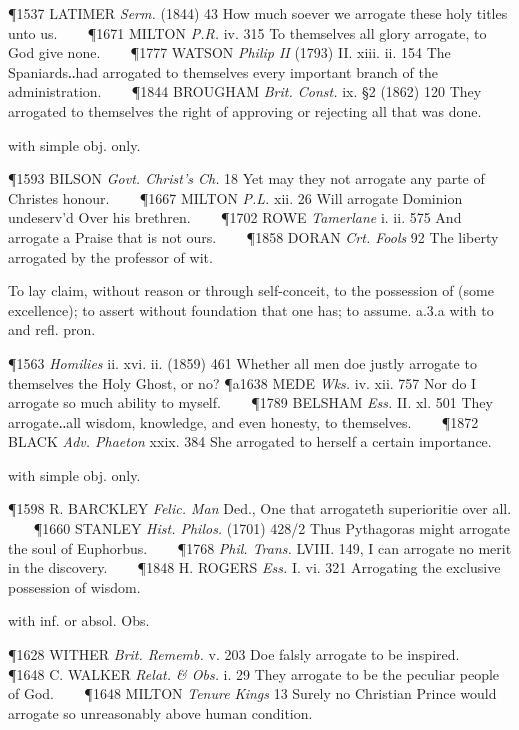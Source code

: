 \begin{description}[wide, labelwidth=!, labelindent=0pt]
\begin{myenumerate}
\P 1537 LATIMER  \textit{Serm.} (1844) 43 How much soever we arrogate these holy titles unto us.    
\P 1671 MILTON  \textit{P.R.} iv. 315 To themselves all glory arrogate, to God give none.    
\P 1777 WATSON  \textit{Philip II} (1793) II. xiii. ii. 154 The Spaniards‥had arrogated to themselves every important branch of the administration.    
\P 1844 BROUGHAM  \textit{Brit. Const.} ix. §2 (1862) 120 They arrogated to themselves the right of approving or rejecting all that was done.

 with simple obj. only.

\P 1593 BILSON  \textit{Govt. Christ's Ch.} 18 Yet may they not arrogate any parte of Christes honour.    
\P 1667 MILTON  \textit{P.L.} xii. 26 Will arrogate Dominion undeserv'd Over his brethren.    
\P 1702 ROWE  \textit{Tamerlane} i. ii. 575 And arrogate a Praise that is not ours.    
\P 1858 DORAN  \textit{Crt. Fools} 92 The liberty arrogated by the professor of wit.

 To lay claim, without reason or through self-conceit, to the possession of (some excellence); to assert without foundation that one has; to assume. a.3.a with to and refl. pron.

\P 1563 \textit{Homilies}  ii. xvi. ii. (1859) 461 Whether all men doe justly arrogate to themselves the Holy Ghost, or no?
\P a1638 MEDE  \textit{Wks.} iv. xii. 757 Nor do I arrogate so much ability to myself.    
\P 1789 BELSHAM  \textit{Ess.} II. xl. 501 They arrogate‥all wisdom, knowledge, and even honesty, to themselves.    
\P 1872 BLACK  \textit{Adv. Phaeton} xxix. 384 She arrogated to herself a certain importance.

 with simple obj. only.

\P 1598 R. BARCKLEY  \textit{Felic. Man} Ded., One that arrogateth superioritie over all.    
\P 1660 STANLEY  \textit{Hist. Philos.} (1701) 428/2 Thus Pythagoras might arrogate the soul of Euphorbus.    
\P 1768 \textit{Phil. Trans.} LVIII. 149, I can arrogate no merit in the discovery.    
\P 1848 H. ROGERS  \textit{Ess.} I. vi. 321 Arrogating the exclusive possession of wisdom.

 with inf. or absol. Obs.

\P 1628 WITHER  \textit{Brit. Rememb.} v. 203 Doe falsly arrogate to be inspired.    
\P 1648 C. WALKER  \textit{Relat. \& Obs.} i. 29 They arrogate to be the peculiar people of God.    
\P 1648 MILTON  \textit{Tenure Kings} 13 Surely no Christian Prince would arrogate so unreasonably above human condition.


\end{myenumerate}
\end{description}
